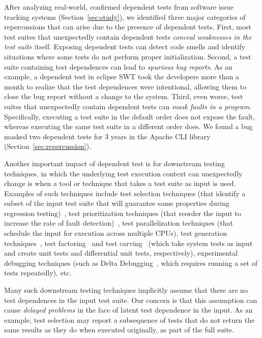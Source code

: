 After analyzing \dtnum real-world, confirmed dependent
tests from \repnum software issue tracking systems
(Section~\ref{sec:study}), we identified three
major categories of repercussions that can arise due to the presence of dependent tests.
First, most test suites that unexpectedly contain dependent tests \emph{conceal
weaknesses in the test suite} itself. Exposing
dependent tests can detect code smells and identify situations
where some tests do not perform proper initialization.
Second, a test suite containing test dependences can lead
to \emph{spurious bug reports}. As an example, a dependent test in
eclipse SWT took the developers
more than a month to realize that the test dependences were intentional,
allowing them to close the bug report without a change to the system.
Third, even worse, test suites that unexpectedly contain dependent tests can
\emph{mask faults in a program}. Specifically, executing a test suite in the
default order does not expose the fault, whereas
executing the same test suite in a different order does. We found 
a bug masked two dependent tests
for 3 years in the Apache CLI library~\cite{cli} (Section~\ref{sec:repercussion}).


Another important impact of dependent test is for downstream testing
techniques, in which the underlying test execution context can
unexpectedly change is when a tool or technique that takes a test
suite as input is used.  Examples of such techniques include
test selection techniques (that identify a subset of
the input test suite that will guarantee some properties during
regression testing)~\cite{harroldetal:OOPSLA:2001},
test prioritization techniques (that reorder the
input to increase the rate of fault detection)~\cite{Elbaum:2000:PTC:347324.348910},
test parallelization techniques (that schedule the input for execution across multiple
CPUs), test generation techniques~\cite{PachecoLET2007, SPLAT},
test factoring~\cite{Saff:2005} and test carving~\cite{Elbaum:2006} (which take system tests as
input and create unit tests and differential unit tests,
respectively), experimental debugging techniques (such as Delta Debugging~\cite{Zeller:2002},
which requires running a set of tests repeatedly), etc. 

Many such downstream testing techniques implicitly assume that
there are no test dependences in the input test suite.  Our concern is
that this assumption can cause \emph{delayed problems} in the face
of latent test dependence in the input.  As an
example, test selection may report a subsequence of tests that do not
return the same results as they do when executed originally, as part of the full suite.

